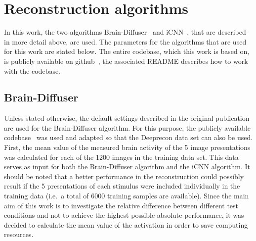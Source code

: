


\section{Reconstruction algorithms}

In this work, the two algorithms Brain-Diffuser~\cite{ozcelikNaturalSceneReconstruction2023} and iCNN~\cite{shenDeepImageReconstruction2019}, that are described in more detail above, are used. The parameters for the algorithms that are used for this work are stated below. The entire codebase, which this work is based on, is publicly available on github~\cite{mildenbergerDiversity_thesis}, the associated README describes how to work with the codebase. 

\subsection{Brain-Diffuser}
Unless stated otherwise, the default settings described in the original publication are used for the Brain-Diffuser algorithm. For this purpose, the publicly available codebase~\cite{ozcelikOzcelikfuBraindiffuser2025} was used and adapted so that the Deeprecon data set can also be used.
First, the mean value of the measured brain activity of the 5 image presentations was calculated for each of the 1200 images in the training data set. This data serves as input for both the Brain-Diffuser algorithm and the iCNN algorithm. It should be noted that a better performance in the reconstruction could possibly result if the 5 presentations of each stimulus were included individually in the training data (i.e.\ a total of 6000 training samples are available). Since the main aim of this work is to investigate the relative difference between different test conditions and not to achieve the highest possible absolute performance, it was decided to calculate the mean value of the activation in order to save computing resources.

